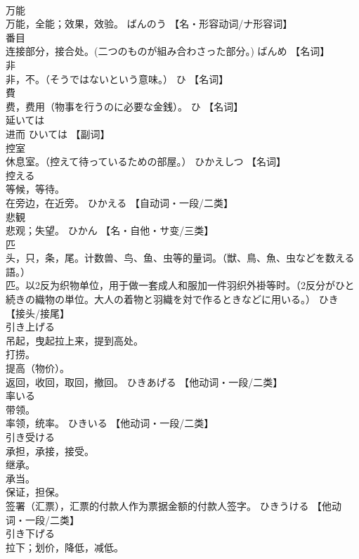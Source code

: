 \documentclass[8pt]{extreport}
\begin{document}
\begin{CJK}{UTF8}{min}
\\	万能	
\\	万能，全能；效果，效验。	ばんのう		【名・形容动词/ナ形容词】
\\	番目	
\\	连接部分，接合处。(二つのものが組み合わさった部分。)	ばんめ		【名词】
\\	非	
\\	非，不。（そうではないという意味。）	ひ		【名词】
\\	費	
\\	费，费用（物事を行うのに必要な金銭）。	ひ		【名词】
\\	延いては	
\\	进而	ひいては		【副词】
\\	控室	
\\	休息室。（控えて待っているための部屋。）	ひかえしつ		【名词】
\\	控える	
\\	等候，等待。 
\\	在旁边，在近旁。	ひかえる		【自动词・一段/二类】
\\	悲観	
\\	悲观；失望。	ひかん		【名・自他・サ变/三类】
\\	匹	
\\	头，只，条，尾。计数兽、鸟、鱼、虫等的量词。（獣、鳥、魚、虫などを数える語。） 
\\	匹。以2反为织物单位，用于做一套成人和服加一件羽织外褂等时。（2反分がひと続きの織物の単位。大人の着物と羽織を対で作るときなどに用いる。）	ひき		【接头/接尾】
\\	引き上げる	
\\	吊起，曳起拉上来，提到高处。 
\\	打捞。 
\\	提高（物价）。 
\\	返回，收回，取回，撤回。	ひきあげる		【他动词・一段/二类】
\\	率いる	
\\	带领。 
\\	率领，统率。	ひきいる		【他动词・一段/二类】
\\	引き受ける	
\\	承担，承接，接受。 
\\	继承。 
\\	承当。 
\\	保证，担保。 
\\	签署（汇票），汇票的付款人作为票据金额的付款人签字。	ひきうける		【他动词・一段/二类】
\\	引き下げる	
\\	拉下；划价，降低，减低。 

\end{CJK}
\end{document}
